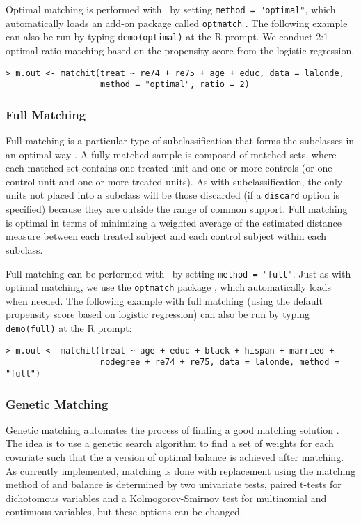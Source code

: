 Optimal matching is performed with \MatchIt\ by setting \texttt{method
  = "optimal"}, which automatically loads an add-on package called
\texttt{optmatch} \citep{Hansen04}.  The following example can also be
run by typing {\tt demo(optimal)} at the R prompt.  We conduct 2:1 optimal
ratio matching based on the propensity score from the logistic
regression.
\begin{verbatim}
> m.out <- matchit(treat ~ re74 + re75 + age + educ, data = lalonde, 
                   method = "optimal", ratio = 2)
\end{verbatim}

\subsubsection{Full Matching}
\label{subsubsec:full}

Full matching is a particular type of subclassification that forms
the subclasses in an optimal way \citep{Rosenbaum02, Hansen04}.  A fully
matched sample is composed of matched sets, where each matched set
contains one treated unit and one or more controls (or one control
unit and one or more treated units).  As with subclassification, the only units not placed into a
subclass will be those discarded (if a \texttt{discard} option is
specified) because they are outside the range of common support.  Full
matching is optimal in terms of minimizing a weighted average of the
estimated distance measure between each treated subject and each
control subject within each subclass.

Full matching can be performed with \MatchIt\ by setting
\texttt{method = "full"}.  Just as with optimal matching, we use the \texttt{optmatch} package \citep{Hansen04}, which automatically loads when 
needed.  The following example with full matching
(using the default propensity score based on logistic regression) can
also be run by typing {\tt demo(full)} at the R prompt:
\begin{verbatim}
> m.out <- matchit(treat ~ age + educ + black + hispan + married +
                   nodegree + re74 + re75, data = lalonde, method = "full")
\end{verbatim}

\subsubsection{Genetic Matching}
\label{subsub:genetic}

Genetic matching automates the process of finding a good matching
solution \citep{DiaSek05}.  The idea is to use a genetic search
algorithm to find a set of weights for each covariate such that the a
version of optimal balance is achieved after matching.  As currently
implemented, matching is done with replacement using the matching
method of \citet{AbaImb04} and balance is determined by two univariate
tests, paired t-tests for dichotomous variables and a
Kolmogorov-Smirnov test for multinomial and continuous variables, but
these options can be changed.

